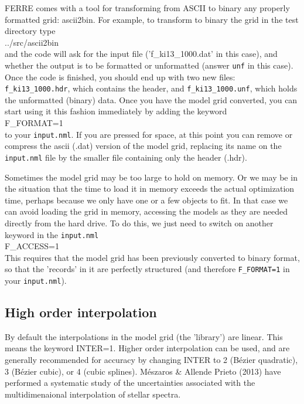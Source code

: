 \documentclass[12pt]{article}
\begin{document}
FERRE comes with a tool for transforming from ASCII to
binary any properly formatted grid: ascii2bin. 
For example, to transform to binary the grid in the test directory type \\
../src/ascii2bin \\
and the code will ask for the input file ('f\_ki13\_1000.dat' in this case), and 
whether the output is to be formatted or unformatted (answer {\tt unf} in this case).
Once the code is finished, you should end up with two new files: {\tt f\_ki13\_1000.hdr},
which contains the header, and {\tt f\_ki13\_1000.unf}, which holds the unformatted (binary)
data. Once you have the model grid converted, you can start using it this fashion
immediately by adding the keyword \\
F\_FORMAT=1 \\
to your {\tt input.nml}. If you are pressed for space, at this point you can 
remove or compress the ascii (.dat) version of the model grid, replacing its name 
on the {\tt input.nml} file by the smaller file containing only the header (.hdr).

Sometimes the model grid may be too large to hold on memory. Or we may be
in the situation that the time to load it in memory exceeds the actual 
optimization time, perhaps because we only have one or a few objects to fit. In that
case we can avoid loading the grid in memory, accessing the models as they are
needed directly from the hard drive. To do this, we just need to switch on another
keyword in the {\tt input.nml} \\
F\_ACCESS=1\\
This requires that the model grid has been previously converted to binary format, 
so that the 'records' in it are perfectly structured (and therefore {\tt F\_FORMAT=1} 
in your {\tt input.nml}).

\subsection{High order interpolation}

By default the interpolations in the model grid (the 'library') are linear.
This means the keyword INTER=1. Higher order interpolation can be used, and
are generally recommended for accuracy by changing INTER to 2 (B\'ezier quadratic),
3 (B\'ezier cubic), or 4 (cubic splines). M\'eszaros \& Allende Prieto (2013) have
performed a systematic study of the uncertainties associated with the
multidimenaional interpolation of stellar spectra.
\end{document}
